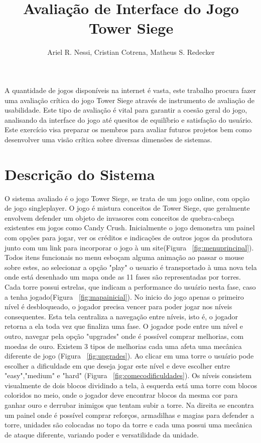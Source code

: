 \documentclass[12pt]{article}
\title{Avaliação de Interface do Jogo Tower Siege}
\author{Ariel R. Nessi\inst{1}, Cristian Cotrena\inst{1}, Matheus S. Redecker\inst{1} }
\begin{document}
 

\maketitle

\begin{resumo} 
  A quantidade de jogos disponíveis na internet é vasta, este trabalho procura fazer uma avaliação crítica do jogo Tower Siege através de instrumento de avaliação de usabilidade. Este tipo de avaliação é vital para garantir a coesão geral do jogo, analisando da interface do jogo até quesitos de equilíbrio e satisfação do usuário. Este exercício visa preparar os membros para avaliar futuros projetos bem como desenvolver uma visão crítica sobre diversas dimensões de sistemas.
\end{resumo}


\section{Descrição do Sistema}

O sistema avaliado é o jogo Tower Siege\cite{towerS}, se trata de um jogo online, com opção de jogo singleplayer. O jogo é mistura conceitos de Tower Siege, que geralmente envolvem defender um objeto de invasores com conceitos de quebra-cabeça existentes em jogos como Candy Crush\cite{candyCrush}. Inicialmente o jogo demonstra um painel com opções para jogar, ver os créditos e indicações de outros jogos da produtora junto com um link para incorporar o jogo à um site(Figura ~\ref{fig:menuprincipal}).\\
Todos itens funcionais no menu esboçam alguma animação ao passar o mouse sobre estes, ao selecionar a opção "play" o usuario é transportado à uma nova tela onde está desenhado um mapa onde as 11 fases são representadas por torres. Cada torre possui estrelas, que indicam a performance do usuário nesta fase, caso a tenha jogado(Figura ~\ref{fig:mapainicial}).
No inicio do jogo apenas o primeiro nível é desbloqueado, o jogador precisa vencer para poder jogar nos níveis consequentes. 
Esta tela centraliza a navegação entre níveis, isto é, o jogador retorna a ela toda vez que finaliza uma fase. 
O jogador pode entre um nível e outro, 
navegar pela opção "upgrades" onde é possível comprar melhorias, com moedas de ouro. 
Existem 3 tipos de melhorias cada uma afeta uma mecânica diferente de jogo (Figura ~\ref{fig:upgrades}).
Ao clicar em uma torre o usuário pode escolher a dificuldade em que deseja jogar este nível e deve escolher entre "easy","medium" e "hard" (Figura ~\ref{fig:comecodificuldades}).
Os níveis consistem visualmente de dois blocos dividindo a tela, à esquerda está uma torre com blocos coloridos no meio, onde o jogador deve encontrar blocos da mesma cor para ganhar ouro e derrubar inimigos que tentam subir a torre. Na direita se encontra um painel onde é possível comprar reforços, armadilhas e magias para defender a torre, unidades são colocadas no topo da torre e cada uma possui uma mecânica de ataque diferente, variando poder e versatilidade da unidade.
\end{document}
